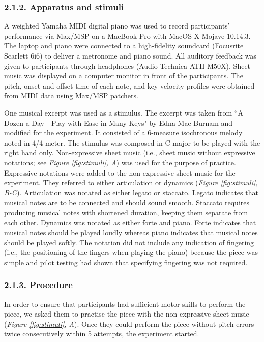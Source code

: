 \documentclass[
  english,
  man,floatsintext]{apa6}
\begin{document}
\hypertarget{apparatus-and-stimuli}{%
\subsubsection{2.1.2. Apparatus and stimuli}\label{apparatus-and-stimuli}}

A weighted Yamaha MIDI digital piano was used to record participants' performance via Max/MSP on a MacBook Pro with MacOS X Mojave 10.14.3. The laptop and piano were connected to a high-fidelity soundcard (Focusrite Scarlett 6i6) to deliver a metronome and piano sound. All auditory feedback was given to participants through headphones (Audio-Technica ATH-M50X). Sheet music was displayed on a computer monitor in front of the participants. The pitch, onset and offset time of each note, and key velocity profiles were obtained from MIDI data using Max/MSP patchers.

One musical excerpt was used as a stimulus. The excerpt was taken from ``A Dozen a Day - Play with Ease in Many Keys" by Edna-Mae Burnam and modified for the experiment. It consisted of a 6-measure isochronous melody noted in 4/4 meter. The stimulus was composed in C major to be played with the right hand only. Non-expressive sheet music (i.e., sheet music without expressive notations; see \emph{Figure \ref{fig:stimuli}, A}) was used for the purpose of practice. Expressive notations were added to the non-expressive sheet music for the experiment. They referred to either articulation or dynamics (\emph{Figure \ref{fig:stimuli}, B-C}). Articulation was notated as either legato or staccato. Legato indicates that musical notes are to be connected and should sound smooth. Staccato requires producing musical notes with shortened duration, keeping them separate from each other. Dynamics was notated as either forte and piano. Forte indicates that musical notes should be played loudly whereas piano indicates that musical notes should be played softly. The notation did not include any indication of fingering (i.e., the positioning of the fingers when playing the piano) because the piece was simple and pilot testing had shown that specifying fingering was not required.

\hypertarget{procedure}{%
\subsubsection{2.1.3. Procedure}\label{procedure}}

In order to ensure that participants had sufficient motor skills to perform the piece, we asked them to practise the piece with the non-expressive sheet music (\emph{Figure \ref{fig:stimuli}, A}). Once they could perform the piece without pitch errors twice consecutively within 5 attempts, the experiment started.
\end{document}
